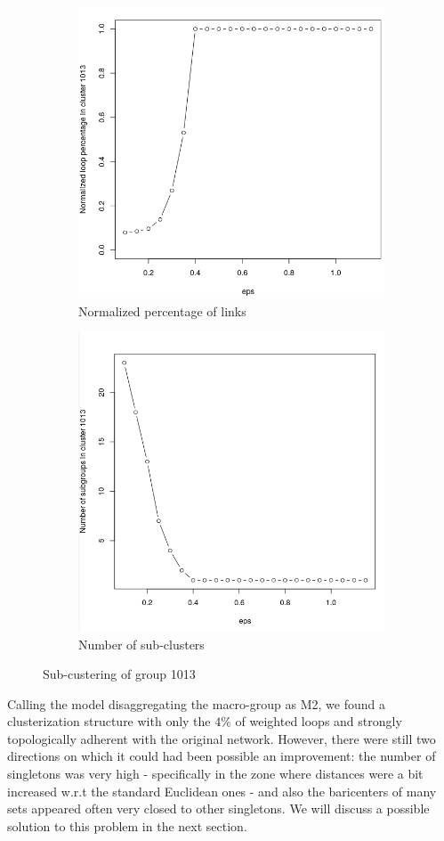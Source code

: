 \documentclass[11pt,twoside]{report}
\begin{document}
\begin{figure}[H]
	\begin{subfigure}[H]{0.5\linewidth}
		\centering
		\includegraphics[width=70 mm]{pictures/1013_1.png}
		\caption{Normalized percentage of links}
	\end{subfigure}
	\hfill
	\begin{subfigure}[H]{0.54\linewidth}
		\centering
		\includegraphics[width=70 mm]{pictures/1013_2.png}
		\caption{Number of sub-clusters}
	\end{subfigure}%
	\caption{Sub-custering of group 1013}
	\label{fig:1013}
\end{figure}
Calling the model disaggregating the macro-group as M2, we found a clusterization structure with only the $ 4\% $ of weighted loops and strongly topologically adherent with the original network. However, there were still two directions on which it could had been possible an improvement: the number of singletons was very high -  specifically in the zone where distances were a bit increased w.r.t the standard Euclidean ones -  and also the baricenters of many sets appeared often very closed to other singletons. We will discuss a possible solution to this problem in the next section.
\end{document}
